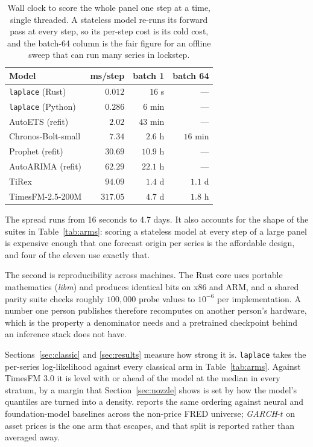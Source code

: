 \documentclass[article]{jss}
\providecommand{\proglang}[1]{\textsf{#1}}
\providecommand{\pkg}[1]{\textit{#1}}
\renewcommand{\pkg}[1]{\textit{#1}}
\providecommand{\code}[1]{\texttt{#1}}
\begin{document}
\begin{table}[t!]
\centering
\small
\begin{tabular}{lrrr}
\toprule
Model & ms/step & batch 1 & batch 64 \\
\midrule
\code{laplace} (\proglang{Rust})   & $0.012$ & $16$ s & --- \\
\code{laplace} (\proglang{Python}) & $0.286$ & $6$ min & --- \\
AutoETS (refit)                     & $2.02$ & $43$ min & --- \\
Chronos-Bolt-small                  & $7.34$ & $2.6$ h & $16$ min \\
Prophet (refit)                     & $30.69$ & $10.9$ h & --- \\
AutoARIMA (refit)                   & $62.29$ & $22.1$ h & --- \\
TiRex                               & $94.09$ & $1.4$ d & $1.1$ d \\
TimesFM-2.5-200M                    & $317.05$ & $4.7$ d & $1.8$ h \\
\bottomrule
\end{tabular}
\caption{Wall clock to score the whole panel one step at a time, single
threaded. A stateless model re-runs its forward pass at every step, so its
per-step cost is its cold cost, and the batch-64 column is the fair figure for
an offline sweep that can run many series in lockstep.}
\label{tab:panel}
\end{table}

The spread runs from 16 seconds to 4.7 days. It also accounts
for the shape of the suites in Table~\ref{tab:arms}: scoring a stateless model
at every step of a large panel is expensive enough that one forecast origin per
series is the affordable design, and four of the eleven use exactly that.

The second is reproducibility across machines. The \proglang{Rust} core uses
portable mathematics (\pkg{libm}) and produces identical bits on x86 and ARM,
and a shared parity suite checks roughly $100{,}000$ probe values to $10^{-6}$
per implementation. A number one person publishes therefore recomputes on
another person's hardware, which is the property a denominator needs and a
pretrained checkpoint behind an inference stack does not have.

Sections~\ref{sec:classic} and \ref{sec:results} measure how strong it is.
\code{laplace} takes the per-series log-likelihood against every classical arm
in Table~\ref{tab:arms}. Against TimesFM 3.0 it is level with or ahead of the
model at the median in every stratum, by a margin that Section~\ref{sec:nozzle}
shows is set by how the model's quantiles are turned into a density.
\citet{cotton2026transforms} reports the same ordering against neural and
foundation-model baselines across the non-price \proglang{FRED} universe;
\pkg{GARCH}-$t$ on asset prices is the one arm that escapes, and that split is
reported rather than averaged away.
\end{document}
